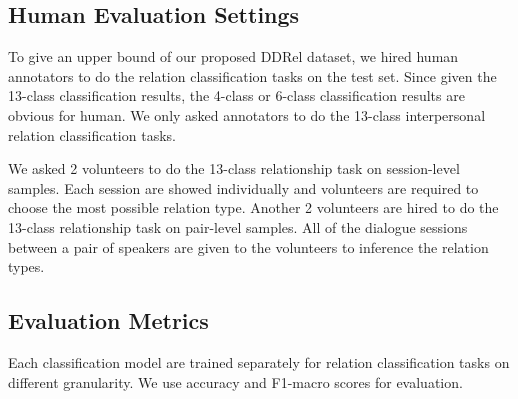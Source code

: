 \subsection{Human Evaluation Settings}

To give an upper bound of our proposed DDRel dataset, we hired human annotators to do the relation classification tasks on the test set. Since given the 13-class classification results, the 4-class or 6-class classification results are obvious for human. We only asked annotators to do the 13-class interpersonal relation classification tasks.

We asked 2 volunteers to do the 13-class relationship task on session-level samples.  Each session are showed individually and volunteers are required to choose the most possible relation type. 
Another 2 volunteers are hired to do the 13-class relationship task on pair-level samples. All of the dialogue sessions between a pair of speakers are given to the volunteers to inference the relation types.


\subsection{Evaluation Metrics}
\label{sec:metrics}
Each classification model are trained separately for relation classification tasks on different granularity. We use accuracy and F1-macro scores for evaluation.



